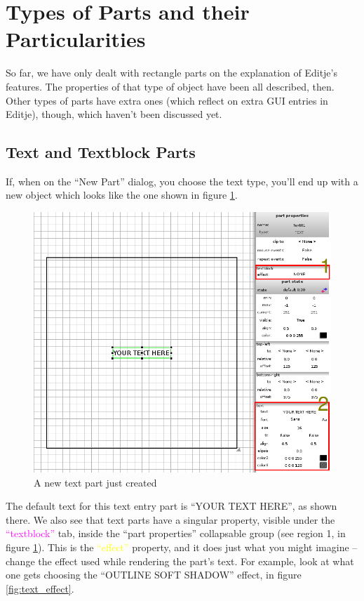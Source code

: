 \documentclass[a4paper]{profusion}
\newcommand{\GUILabel}[1]{\textcolor{magenta}{#1}}
\newcommand{\GUIEditable}[1]{\textcolor{yellow}{#1}} %
\begin{document}
\section{Types of Parts and their Particularities}

So far, we have only dealt with rectangle parts on the explanation of
Editje's features. The properties of that type of object have been all
described, then. Other types of parts have extra ones (which reflect
on extra GUI entries in Editje), though, which haven't been discussed
yet.

\subsection{Text and Textblock Parts}

If, when on the ``New Part'' dialog, you choose the text type, you'll
end up with a new object which looks like the one shown in figure
\ref{fig:new_text}.

\begin{figure}[h!]
  \centering
  \includegraphics[width=1.0\textwidth]{images/new_text.png}
  \caption{A new text part just created}
  \label{fig:new_text}
\end{figure}

The default text for this text entry part is ``YOUR TEXT HERE'', as
shown there. We also see that text parts have a singular property,
visible under the \GUILabel{``textblock''} tab, inside the ``part
properties'' collapsable group (see region 1, in figure
\ref{fig:new_text}).  This is the \GUIEditable{``effect''} property,
and it does just what you might imagine -- change the effect used
while rendering the part's text. For example, look at what one gets
choosing the ``OUTLINE SOFT SHADOW'' effect, in figure
\ref{fig:text_effect}.
\end{document}
